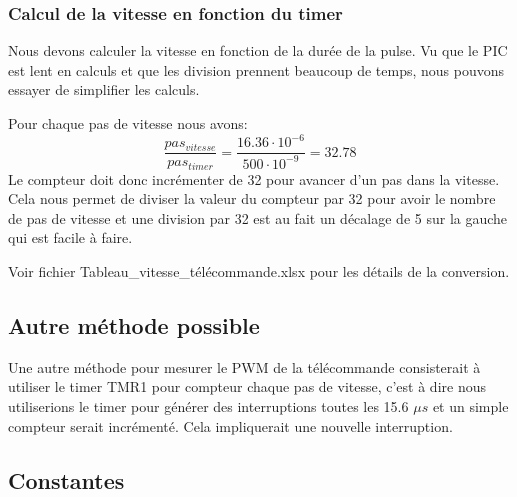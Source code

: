 \documentclass[fleqn, 11pt, a4paper]{article}
\begin{document}
    \subsubsection{Calcul de la vitesse en fonction du timer}
    Nous devons calculer la vitesse en fonction de la durée de la pulse.
    Vu que le PIC est lent en calculs et que les division prennent beaucoup de temps, nous pouvons essayer de simplifier les calculs.
    
    Pour chaque pas de vitesse nous avons:
    $$\frac{pas_{vitesse}}{pas_{timer}} =  \frac{16.36 \cdot 10^{-6}}{500 \cdot 10^{-9}}=32.78$$
    Le compteur doit donc incrémenter de 32 pour avancer d'un pas dans la vitesse. Cela nous permet de diviser la valeur du compteur par 32 pour avoir le nombre de pas de vitesse et une division par 32 est au fait un décalage de 5 sur la gauche qui est facile à faire.
    
    Voir fichier Tableau\_vitesse\_télécommande.xlsx pour les détails de la conversion.
    
    
    \subsection{Autre méthode possible}
    Une autre méthode pour mesurer le PWM de la télécommande consisterait à utiliser le timer TMR1 pour compteur chaque pas de vitesse, c'est à dire nous utiliserions le timer pour générer des interruptions toutes les 15.6 $\mu s$ et un simple compteur serait incrémenté. Cela impliquerait une nouvelle interruption.
    
  
  
	\newpage
	\begin{appendix}
	\section{Constantes}

	
	\end{appendix}
	
	
\end{document}
